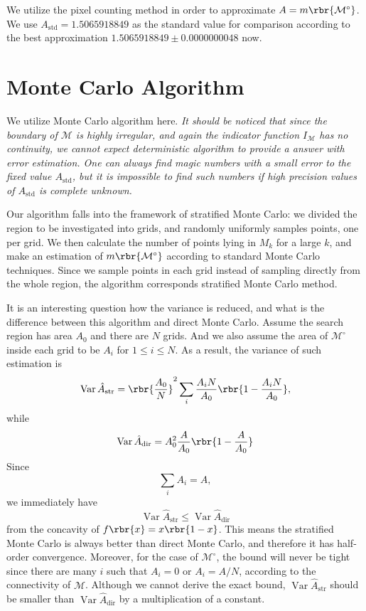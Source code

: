 \documentclass[english, nochinese]{pnote}
\DeclareMathOperator\opvar{\mathrm{Var}}
\begin{document}
We utilize the pixel counting method in order to approximate $ A = m \rbr{\mathcal{M}^{\circ}} $. We use $ A_{\text{std}} = 1.5065918849 $ as the standard value for comparison according to the best approximation $ 1.5065918849 \pm 0.0000000048 $ now.

\section{Monte Carlo Algorithm}

We utilize Monte Carlo algorithm here. \emph{It should be noticed that since the boundary of $\mathcal{M}$ is highly irregular, and again the indicator function $I_{\mathcal{M}}$ has no continuity, we cannot expect deterministic algorithm to provide a answer with error estimation. One can always find magic numbers with a small error to the fixed value $A_{\text{std}}$, but it is impossible to find such numbers if high precision values of $A_{\text{std}}$ is complete unknown.}

Our algorithm falls into the framework of stratified Monte Carlo: we divided the region to be investigated into grids, and randomly uniformly samples points, one per grid. We then calculate the number of points lying in $M_k$ for a large $k$, and make an estimation of $ m \rbr{\mathcal{M}^{\circ}} $ according to standard Monte Carlo techniques. Since we sample points in each grid instead of sampling directly from the whole region, the algorithm corresponds stratified Monte Carlo method.

It is an interesting question how the variance is reduced, and what is the difference between this algorithm and direct Monte Carlo. Assume the search region has area $A_0$ and there are $N$ grids. And we also assume the area of $\mathcal{M}^{\circ}$ inside each grid to be $A_i$ for $ 1 \le i \le N $. As a result, the variance of such estimation is
\begin{equation}
\opvar \hat{A}_{\text{str}} = \rbr{\frac{A_0}{N}}^2 \sum_i \frac{ A_i N }{A_0} \rbr{ 1 - \frac{ A_i N }{A_0 } },
\end{equation}
while
\begin{equation}
\opvar \hat{A}_{\text{dir}} = A_0^2 \frac{A}{A_0} \rbr{ 1 - \frac{A}{A_0} }
\end{equation}
Since
\begin{equation}
\sum_i A_i = A,
\end{equation}
we immediately have
\begin{equation}
\opvar \hat{A}_{\text{str}} \le \opvar \hat{A}_{\text{dir}}
\end{equation}
from the concavity of $ f \rbr{x} = x \rbr{ 1 - x } $. This means the stratified Monte Carlo is always better than direct Monte Carlo, and therefore it has half-order convergence. Moreover, for the case of $\mathcal{M}^{\circ}$, the bound will never be tight since there are many $i$ such that $ A_i = 0 $ or $ A_i = A / N $, according to the connectivity of $\mathcal{M}$. Although we cannot derive the exact bound, $ \opvar \hat{A}_{\text{str}} $ should be smaller than $ \opvar \hat{A}_{\text{dir}} $ by a multiplication of a constant.
\end{document}
